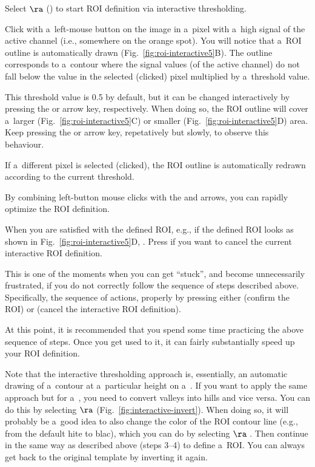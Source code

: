 \s Select  $\ra$  () to start ROI definition via interactive thresholding.

\nb
\bul Click with a~left-mouse button on the image in a~pixel with a~high signal of the active channel (i.e., somewhere on the orange spot). You will notice that a~ROI outline is automatically drawn (Fig.~\ref{fig:roi-interactive5}B). The outline corresponds to a~contour where the signal values (of the active channel) do not fall below the value in the selected (clicked) pixel multiplied by a~threshold value.

\bul This threshold value is 0.5 by default, but it can be changed interactively by pressing the  or  arrow key, respectively. When doing so, the ROI outline will cover a~larger (Fig.~\ref{fig:roi-interactive5}C) or smaller (Fig.~\ref{fig:roi-interactive5}D) area. Keep pressing the  or  arrow key, repetatively but slowly, to observe this behaviour. 

\bul If a~different pixel is selected (clicked), the ROI outline is automatically redrawn according to the current threshold.

\bul By combining left-button mouse clicks with the  and  arrows, you can rapidly optimize the ROI definition.

\s When you are satisfied with the defined ROI, e.g., if the defined ROI looks as shown in Fig.~\ref{fig:roi-interactive5}D, . Press  if you want to cancel the current interactive ROI definition.

\nb
\bul This is one of the moments when you can get ``stuck'', and become unnecessarily frustrated, if you do not correctly follow the sequence of steps described above. Specifically,  the  sequence of actions,  properly by pressing either  (confirm the ROI) or  (cancel the interactive ROI definition). 

\s At this point, it is recommended that you spend some time practicing the above sequence of steps. Once you get used to it, it can fairly substantially speed up your ROI definition.

\s Note that the interactive thresholding approach is, essentially, an automatic drawing of a~contour at a~particular height on a~. If you want to apply the same approach but for a~, you need to convert valleys into hills and vice versa. You can do this by selecting  $\ra$  (Fig.~\ref{fig:interactive-invert}). When doing so, it will probably be a~good idea to also change the color of the ROI contour line (e.g., from the default hite to blac), which you can do by selecting  $\ra$ . Then continue in the same way as described above (steps 3--4) to define a~ROI. You can always get back to the original template by inverting it again.

